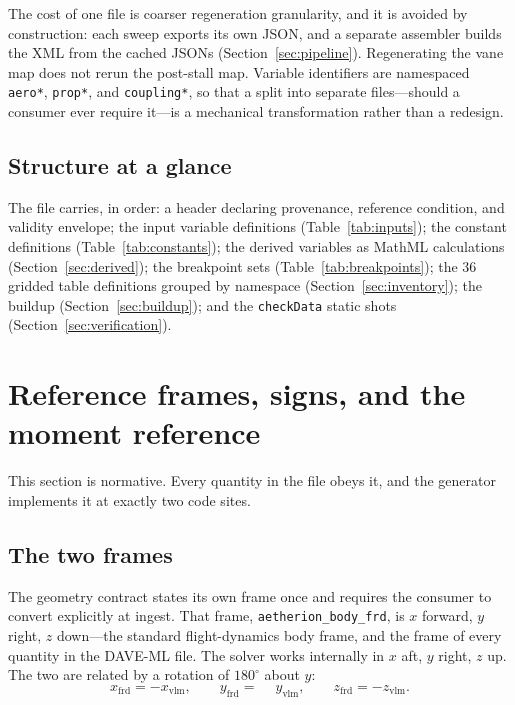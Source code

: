 \documentclass[11pt,a4paper]{article}
\newcommand{\varid}[1]{\texttt{\small #1}}
\newcommand{\dg}{^\circ}
\begin{document}
The cost of one file is coarser regeneration granularity, and it is
avoided by construction: each sweep exports its own JSON, and a
separate assembler builds the XML from the cached JSONs
(Section~\ref{sec:pipeline}). Regenerating the vane map does not rerun
the post-stall map. Variable identifiers are namespaced
\varid{aero*}, \varid{prop*}, and \varid{coupling*}, so that a split into
separate files---should a consumer ever require it---is a mechanical
transformation rather than a redesign.

\subsection{Structure at a glance}

The file carries, in order: a header declaring provenance, reference
condition, and validity envelope; the input variable definitions
(Table~\ref{tab:inputs}); the constant definitions
(Table~\ref{tab:constants}); the derived variables as MathML calculations
(Section~\ref{sec:derived}); the breakpoint sets
(Table~\ref{tab:breakpoints}); the 36 gridded table definitions grouped
by namespace (Section~\ref{sec:inventory}); the buildup
(Section~\ref{sec:buildup}); and the \texttt{checkData} static shots
(Section~\ref{sec:verification}).

\section{Reference frames, signs, and the moment reference}
\label{sec:frames}

This section is normative. Every quantity in the file obeys it, and the
generator implements it at exactly two code sites.

\subsection{The two frames}

The geometry contract states its own frame once and requires the consumer
to convert explicitly at ingest. That frame,
\texttt{aetherion\_body\_frd}, is $x$ forward, $y$ right, $z$ down---the
standard flight-dynamics body frame, and the frame of every quantity in
the DAVE-ML file. The solver works internally in $x$ aft, $y$ right, $z$
up. The two are related by a rotation of $180\dg$ about $y$:
\begin{equation}
x_{\mathrm{frd}} = -x_{\mathrm{vlm}}, \qquad
y_{\mathrm{frd}} = \phantom{-}y_{\mathrm{vlm}}, \qquad
z_{\mathrm{frd}} = -z_{\mathrm{vlm}}.
\label{eq:flip}
\end{equation}
\end{document}
